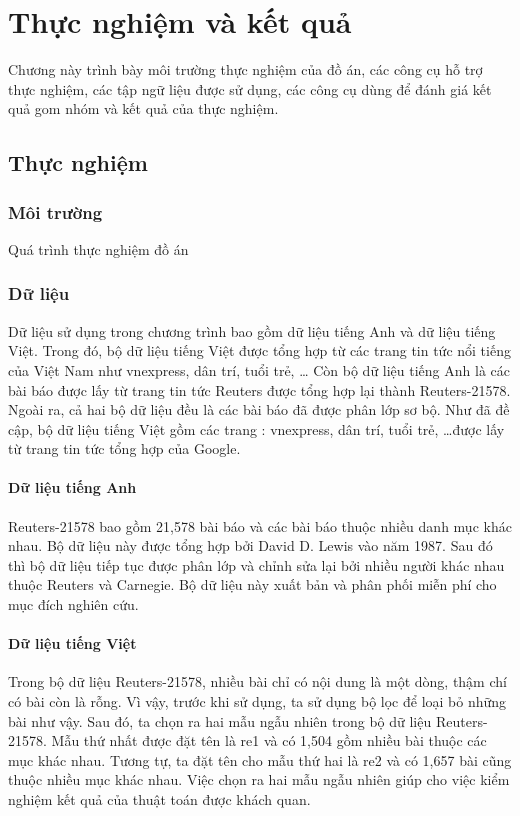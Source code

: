 \chapter{Thực nghiệm và kết quả}
\label{Chapter4}
Chương này trình bày môi trường thực nghiệm của đồ án, các công cụ hỗ trợ thực nghiệm, các tập ngữ liệu được sử dụng, các công cụ dùng để đánh giá kết quả gom nhóm và kết quả của thực nghiệm.

\section{Thực nghiệm}
\subsection{Môi trường}
Quá trình thực nghiệm đồ án 


\subsection{Dữ liệu}
Dữ liệu sử dụng trong chương trình bao gồm dữ liệu tiếng Anh và dữ liệu tiếng Việt.
Trong đó, bộ dữ liệu tiếng Việt được tổng hợp từ các trang tin tức nổi tiếng của Việt Nam như vnexpress, dân trí, tuổi trẻ, \ldots
Còn bộ dữ liệu tiếng Anh là các bài báo được lấy từ trang tin tức Reuters được tổng hợp lại thành Reuters-21578.
Ngoài ra, cả hai bộ dữ liệu đều là các bài báo đã được phân lớp sơ bộ.
Như đã đề cập, bộ dữ liệu tiếng Việt gồm các trang : vnexpress, dân trí, tuổi trẻ, \ldots được lấy từ trang tin tức tổng hợp của Google.

\subsubsection{Dữ liệu tiếng Anh}
Reuters-21578 bao gồm 21,578 bài báo và các bài báo thuộc nhiều danh mục khác nhau.
Bộ dữ liệu này được tổng hợp bởi David D. Lewis vào năm 1987.
Sau đó thì bộ dữ liệu tiếp tục được phân lớp và chỉnh sửa lại bởi nhiều người khác nhau thuộc Reuters và Carnegie.
Bộ dữ liệu này xuất bản và phân phối miễn phí cho mục đích nghiên cứu.

\subsubsection{Dữ liệu tiếng Việt}
Trong bộ dữ liệu Reuters-21578, nhiều bài chỉ có nội dung là một dòng, thậm chí có bài còn là rỗng.
Vì vậy, trước khi sử dụng, ta sử dụng bộ lọc để loại bỏ những bài như vậy.
Sau đó, ta chọn ra hai mẫu ngẫu nhiên trong bộ dữ liệu Reuters-21578.
Mẫu thứ nhất được đặt tên là re1 và có 1,504 gồm nhiều bài thuộc các mục khác nhau.
Tương tự, ta đặt tên cho mẫu thứ hai là re2 và có 1,657 bài cũng thuộc nhiều mục khác nhau.
Việc chọn ra hai mẫu ngẫu nhiên giúp cho việc kiểm nghiệm kết quả của thuật toán được khách quan.

